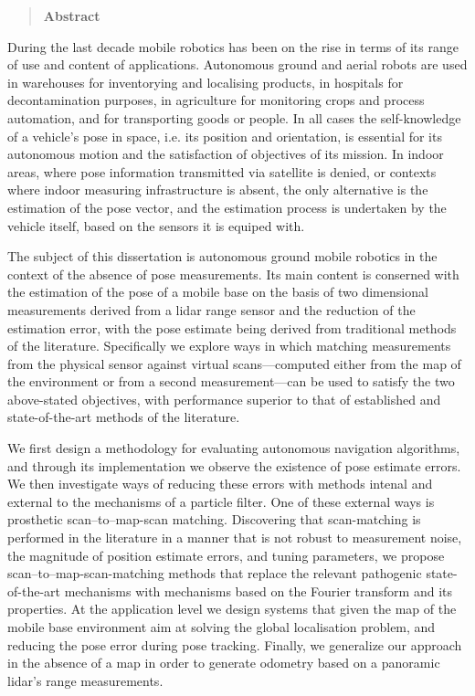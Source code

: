 \newpage

\begin{quotation}
\begin{center}
\textbf{Abstract}
\end{center}
\noindent
\end{quotation}

During the last decade mobile robotics has been on the rise in terms of its
range of use and content of applications. Autonomous ground and aerial robots
are used in warehouses for inventorying and localising products, in hospitals
for decontamination purposes, in agriculture for monitoring crops and process
automation, and for transporting goods or people. In all cases the
self-knowledge of a vehicle's pose in space, i.e. its position and orientation,
is essential for its autonomous motion and the satisfaction of objectives of
its mission. In indoor areas, where pose information transmitted via satellite
is denied, or contexts where indoor measuring infrastructure is absent, the
only alternative is the estimation of the pose vector, and the estimation
process is undertaken by the vehicle itself, based on the sensors it is equiped
with.

The subject of this dissertation is autonomous ground mobile robotics in the
context of the absence of pose measurements. Its main content is conserned with
the estimation of the pose of a mobile base on the basis of two dimensional
measurements derived from a lidar range sensor and the reduction of the
estimation error, with the pose estimate being derived from traditional methods
of the literature. Specifically we explore ways in which matching measurements
from the physical sensor against virtual scans---computed either from the map
of the environment or from a second measurement---can be used to satisfy the
two above-stated objectives, with performance superior to that of established
and state-of-the-art methods of the literature.

We first design a methodology for evaluating autonomous navigation algorithms,
and through its implementation we observe the existence of pose estimate
errors. We then investigate ways of reducing these errors with methods intenal
and external to the mechanisms of a particle filter. One of these external ways
is prosthetic scan--to--map-scan matching. Discovering that scan-matching is
performed in the literature in a manner that is not robust to measurement
noise, the magnitude of position estimate errors, and tuning parameters, we
propose scan--to--map-scan-matching methods that replace the relevant
pathogenic state-of-the-art mechanisms with mechanisms based on the Fourier
transform and its properties. At the application level we design systems that
given the map of the mobile base environment aim at solving the global
localisation problem, and reducing the pose error during pose tracking.
Finally, we generalize our approach in the absence of a map in order to
generate odometry based on a panoramic lidar's range measurements.


\restoregeometry
\doublespace
